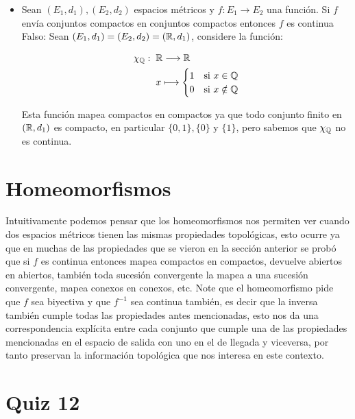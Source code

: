 \begin{itemize}[label={✎},leftmargin=*]
\item  Sean $\left(E_1, d_1\right),\left(E_2, d_2\right)$ espacios métricos y $f: E_1 \rightarrow E_2$ una función. Si $f$ envía conjuntos compactos en conjuntos compactos entonces $f$ es continua\\

Falso: Sean $(E_1,d_1)=(E_2,d_2)=(\mathbb{R},d_1)$, considere la función:

\begin{align*}
    \chi_\mathbb{Q}: \hspace{2mm} &\mathbb{R} \longrightarrow \mathbb{R}\\
    &x \longmapsto \begin{cases}
        1 & \text{si } x\in \mathbb{Q}\\
        0 & \text{si } x \notin \mathbb{Q}
    \end{cases}
\end{align*}

Esta función mapea compactos en compactos ya que todo conjunto finito en $(\mathbb{R},d_1)$ es compacto, en particular $\{0,1\},\{0\}$ y $\{1\}$, pero sabemos que $\chi_{\mathbb{Q}}$ no es continua.

\end{itemize}

\section{Homeomorfismos}

Intuitivamente podemos pensar que los homeomorfismos nos permiten ver cuando dos espacios métricos tienen las mismas propiedades topológicas, esto ocurre ya que en muchas de las propiedades que se vieron en la sección anterior se probó que si $f$ es continua entonces mapea compactos en compactos, devuelve abiertos en abiertos, también toda sucesión convergente la mapea a una sucesión convergente, mapea conexos en conexos, etc. Note que el homeomorfismo pide que $f$ sea biyectiva y que $f^{-1}$ sea continua también, es decir que la inversa también cumple todas las propiedades antes mencionadas, esto nos da una correspondencia explícita entre cada conjunto que cumple una de las propiedades mencionadas en el espacio de salida con uno en el de llegada y viceversa, por tanto preservan la información topológica que nos interesa en este contexto.

\section{Quiz 12}

